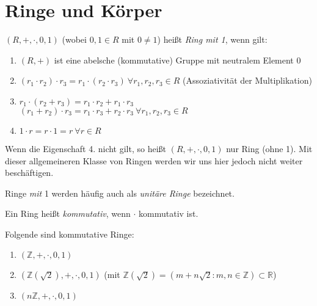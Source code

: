 \documentclass[10pt]{scrbook}
\begin{document}
\section{Ringe und Körper}

\begin{Def}
$(R, +, \cdot, 0, 1)$ (wobei $0, 1\in R$ mit $0\neq 1$) heißt \emph{Ring mit 1}, wenn gilt:
\begin{enumerate}
	\item $(R, +)$ ist eine abelsche (kommutative) Gruppe mit neutralem Element 0
	\item $(r_1\cdot r_2)\cdot r_3=r_1\cdot (r_2\cdot r_3)\ \forall r_1, r_2, r_3\in R$ (Assoziativität der Multiplikation)
	\item $r_1\cdot (r_2+ r_3) = r_1\cdot r_2+r_1\cdot r_3$\\ $(r_1 + r_2)\cdot r_3 = r_1\cdot r_3+r_2\cdot r_3\ \forall r_1, r_2, r_3\in R$
	\item $1\cdot r=r\cdot 1=r\ \forall r\in R$
\end{enumerate}
\end{Def}

\begin{Bem}
Wenn die Eigenschaft 4. nicht gilt, so heißt $(R, +, \cdot, 0, 1)$ nur Ring (ohne 1). Mit dieser allgemeineren Klasse von Ringen werden wir uns hier jedoch nicht weiter beschäftigen.
\end{Bem}

\begin{Bem}
Ringe \emph{mit} 1 werden häufig auch als \emph{unitäre Ringe} bezeichnet.
\end{Bem}

\begin{Bem}
Ein Ring heißt \emph{kommutativ}, wenn $\cdot$ kommutativ ist.
\end{Bem}

\begin{Bsp}
Folgende sind kommutative Ringe:
\begin{enumerate}
	\item $\left(\mathbb{Z}, +, \cdot, 0, 1\right)$
	\item $\left(\mathbb{Z}\left(\sqrt{2}\right), +, \cdot, 0, 1\right)$ (mit $\mathbb{Z}\left(\sqrt{2}\right)=\left(m+n\sqrt{2}: m, n\in \mathbb{Z}\right)\subset \mathbb{R}$)
	\item $\left(n \mathbb{Z}, +, \cdot, 0, 1\right)$
\end{enumerate}
\end{Bsp}
\end{document}
